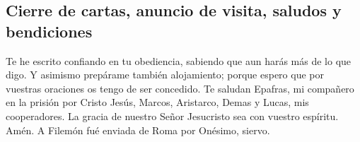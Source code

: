 \hypertarget{cierre-de-cartas-anuncio-de-visita-saludos-y-bendiciones}{%
\subsection{Cierre de cartas, anuncio de visita, saludos y
bendiciones}\label{cierre-de-cartas-anuncio-de-visita-saludos-y-bendiciones}}

 Te he escrito confiando en tu obediencia, sabiendo que aun
harás más de lo que digo.  Y asimismo prepárame también
alojamiento; porque espero que por vuestras oraciones os tengo de ser
concedido.  Te saludan Epafras, mi compañero en la prisión
por Cristo Jesús,  Marcos, Aristarco, Demas y Lucas, mis
cooperadores.  La gracia de nuestro Señor Jesucristo sea
con vuestro espíritu. Amén. A Filemón fué enviada de Roma por Onésimo,
siervo.
